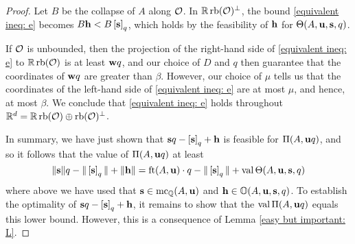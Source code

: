 \documentclass[11pt]{amsart}
\renewcommand{\!}[1]{{\color{red}\text{$\star$\,}#1\,$\star$}}
\begin{document}
\begin{proof}
Let $B$ be the collapse of $A$ along $\mathcal{O}$.  In $\mathbb{R} \operatorname{rb}(\mathcal{O})^{\perp}$, the bound \eqref{equivalent ineq: e} becomes $B \mathbf{h} < B \left[ \mathbf{s} \right]_q$, which holds by the feasibility of $\mathbf{h}$ for $\Theta(A, \mathbf{u}, \mathbf{s}, q)$.  

If $\mathcal{O}$ is unbounded, then the projection of the right-hand side of \eqref{equivalent ineq: e} to $\mathbb{R} \operatorname{rb}(\mathcal{O})$ is at least $\mathbf{w}q$, and our choice of $D$ and $q$ then guarantee that the coordinates of $\mathbf{w}q$ are greater than $\beta$.  However,  our choice of $\mu$ tells us that the coordinates of the left-hand side of \eqref{equivalent ineq: e} are at most $\mu$, and hence, at most $\beta$.  We conclude that \eqref{equivalent ineq: e} holds throughout $\mathbb{R}^d = \mathbb{R} \operatorname{rb}(\mathcal{O}) \oplus \operatorname{rb}(\mathcal{O})^{\perp}$.

In summary, we have just shown that $\mathbf{s}q-\left[ \mathbf{s} \right]_q + \mathbf{h}$ is feasible for $\Pi(A, \mathbf{u}q)$, and so it follows that the value of $\Pi(A, \mathbf{u}q)$ at least 
\[  \| \mathbf{s} \|q - \| \left[ \mathbf{s} \right]_q \| + \| \mathbf{h} \| = \operatorname{ft}(A, \mathbf{u}) \cdot q - \| \left[ \mathbf{s} \right]_q \| + \operatorname{val} \Theta(A, \mathbf{u}, \mathbf{s}, q) \] 
where above we have used that $\mathbf{s} \in \operatorname{mc}_{\mathbb{Q}}(A, \mathbf{u})$ and $\mathbf{h} \in \mathbb{O}(A, \mathbf{u}, \mathbf{s}, q)$.  To establish the optimality of $\mathbf{s}q - \left[ \mathbf{s} \right]_q + \mathbf{h}$, it remains to show that the $\operatorname{val} \Pi(A, \mathbf{u}q)$ equals this lower bound.  However, this is a consequence of Lemma \ref{easy but important: L}.
\end{proof}
\end{document}
